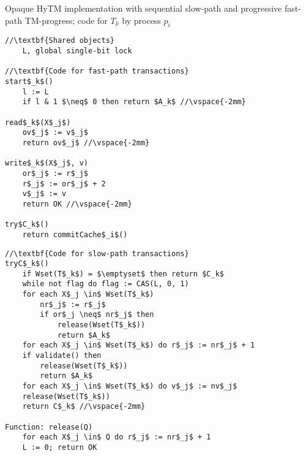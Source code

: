 \begin{algorithm*}[!t]
\caption{Opaque HyTM implementation with sequential slow-path and progressive fast-path TM-progress; code for $T_k$ by process $p_i$}
\label{alg:inswrite2}
\vspace{-2mm}
\noindent\lstset{style=customc}
\begin{minipage}{0.49\textwidth}
\begin{lstlisting}[frame=none,firstnumber=1,mathescape=true]
//\textbf{Shared objects}
    L, global single-bit lock

//\textbf{Code for fast-path transactions}
start$_k$()
    l := L 
    if l & 1 $\neq$ 0 then return $A_k$ //\vspace{-2mm}

read$_k$(X$_j$)
    ov$_j$ := v$_j$ 
    return ov$_j$ //\vspace{-2mm}

write$_k$(X$_j$, v)
    or$_j$ := r$_j$ 
    r$_j$ := or$_j$ + 2 
    v$_j$ := v 
    return OK //\vspace{-2mm}

try$C_k$()
    return commitCache$_i$() 
\end{lstlisting}
\end{minipage}
\begin{minipage}{0.49\textwidth}
\begin{lstlisting}[frame=none,firstnumber=last,mathescape=true]
//\textbf{Code for slow-path transactions}
tryC$_k$()
    if Wset(T$_k$) = $\emptyset$ then return $C_k$
    while not flag do flag := CAS(L, 0, 1)
    for each X$_j \in$ Wset(T$_k$)
        nr$_j$ := r$_j$
        if or$_j \neq$ nr$_j$ then
            release(Wset(T$_k$))
            return $A_k$
    for each X$_j \in$ Wset(T$_k$) do r$_j$ := nr$_j$ + 1
    if validate() then
        release(Wset(T$_k$))
        return $A_k$
    for each X$_j \in$ Wset(T$_k$) do v$_j$ := nv$_j$
    release(Wset(T$_k$))
    return C$_k$ //\vspace{-2mm}
    
Function: release(Q)
    for each X$_j \in$ Q do r$_j$ := nr$_j$ + 1
    L := 0; return OK
\end{lstlisting}
\end{minipage}
\vspace{-2mm}
\end{algorithm*}
